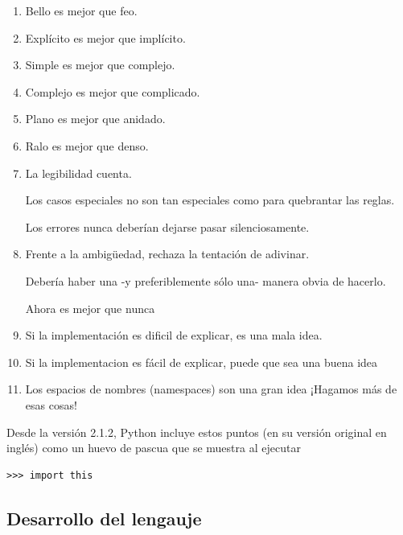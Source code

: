 \documentclass[a4paper]{report}
\begin{document}
\begin{enumerate}
  \item Bello es mejor que feo.
  \item Explícito es mejor que implícito.
  \item Simple es mejor que complejo.
  \item Complejo es mejor que complicado.
  \item Plano es mejor que anidado.
  \item Ralo es mejor que denso.
  \item La legibilidad cuenta.
  \begin{item}
    Los casos especiales no son tan especiales como para quebrantar las reglas.
  \end{item}
  \begin{item}
    Los errores nunca deberían dejarse pasar silenciosamente.
  \end{item}
  \item {Frente a la ambigüedad, rechaza la tentación de adivinar.}
  \begin{item}
    Debería haber una -y preferiblemente sólo una- manera obvia de hacerlo. 
  \end{item}
  \begin{item}
    Ahora es mejor que nunca
  \end{item}
  \item {Si la implementación es dificil de explicar, es una mala idea.}
  \item {Si la implementacion es fácil de explicar, puede que sea una buena idea}
  \item {Los espacios de nombres (namespaces) son una gran idea ¡Hagamos más de esas cosas!}
  \end{enumerate}
  Desde la versión 2.1.2, Python incluye estos puntos (en su versión original en inglés) 
  como un huevo de pascua que se muestra al ejecutar 
\begin{lstlisting}[style=consola]
>>> import this
\end{lstlisting}

\subsection{Desarrollo del lengauje}
\end{document}
